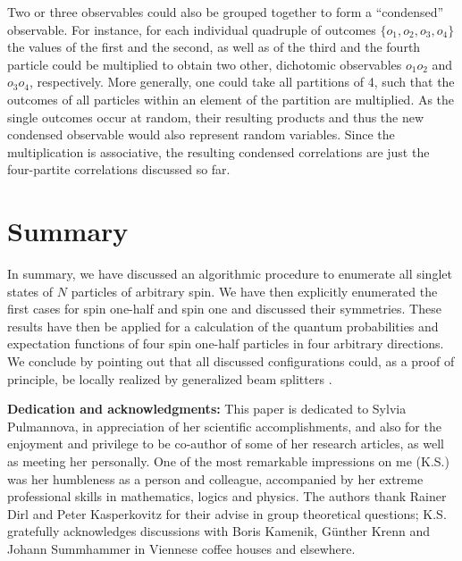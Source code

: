 \documentclass[rmp,amsfonts,showpacs,showkeys,preprint]{revtex4}
\begin{document}
Two or three observables could also be grouped together to form a ``condensed'' observable.
For instance, for each individual quadruple of outcomes $\{o_1,o_2,o_3,o_4\}$
the values of the first and the
second, as well as of the third and the
fourth particle could be multiplied to obtain two other, dichotomic observables
$o_1o_2$ and $o_3o_4$, respectively. More generally, one could take all partitions of 4,
such that the outcomes of all particles within an element of the partition
are multiplied. As the single outcomes occur at random, their resulting products
and thus the new condensed observable would also represent random variables. Since the multiplication is associative,
the resulting condensed correlations are just the four-partite correlations discussed
so far.

\section{Summary}

In summary, we have discussed an algorithmic procedure to enumerate all singlet states of $N$ particles of arbitrary spin.
We have then explicitly enumerated the first cases for spin one-half and spin one and discussed their symmetries.
These results have then be applied for a calculation of the quantum probabilities and expectation functions of
four spin one-half particles in four arbitrary directions.
We conclude by pointing out that all discussed configurations could,
as a proof of principle, be locally realized
by generalized beam splitters \cite{rzbb,zukowski-97,svozil-2004-analog}.








{\bf Dedication and acknowledgments:}
This paper is dedicated to Sylvia Pulmannova, in appreciation of her scientific accomplishments,
and also for the enjoyment and privilege to be co-author of some of her research articles, as well as meeting her personally.
One of the most remarkable impressions on me (K.S.) was her humbleness as a person and colleague, accompanied by her extreme professional skills in mathematics, logics and physics.
The authors thank Rainer Dirl and Peter Kasperkovitz for their advise in group theoretical questions; K.S. gratefully acknowledges discussions with Boris Kamenik, G\"unther Krenn and Johann Summhammer in Viennese coffee houses and elsewhere.
\end{document}
